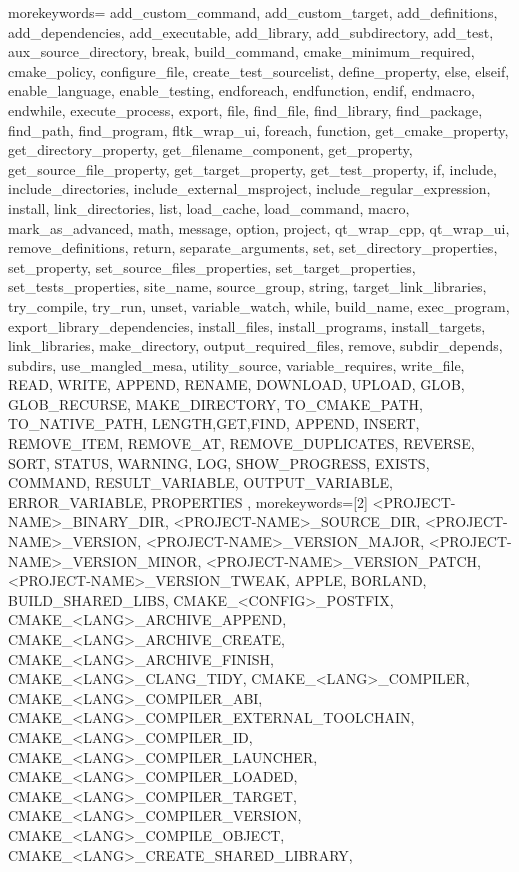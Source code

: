 	{
         morekeywords={
add_custom_command,
add_custom_target,
add_definitions,
add_dependencies,
add_executable,
add_library,
add_subdirectory,
add_test,
aux_source_directory,
break,
build_command,
cmake_minimum_required,
cmake_policy,
configure_file,
create_test_sourcelist,
define_property,
else,
elseif,
enable_language,
enable_testing,
endforeach,
endfunction,
endif,
endmacro,
endwhile,
execute_process,
export,
file,
find_file,
find_library,
find_package,
find_path,
find_program,
fltk_wrap_ui,
foreach,
function,
get_cmake_property,
get_directory_property,
get_filename_component,
get_property,
get_source_file_property,
get_target_property,
get_test_property,
if,
include,
include_directories,
include_external_msproject,
include_regular_expression,
install,
link_directories,
list,
load_cache,
load_command,
macro,
mark_as_advanced,
math,
message,
option,
project,
qt_wrap_cpp,
qt_wrap_ui,
remove_definitions,
return,
separate_arguments,
set,
set_directory_properties,
set_property,
set_source_files_properties,
set_target_properties,
set_tests_properties,
site_name,
source_group,
string,
target_link_libraries,
try_compile,
try_run,
unset,
variable_watch,
while,
build_name,
exec_program,
export_library_dependencies,
install_files,
install_programs,
install_targets,
link_libraries,
make_directory,
output_required_files,
remove,
subdir_depends,
subdirs,
use_mangled_mesa,
utility_source,
variable_requires,
write_file,
READ, WRITE, APPEND, RENAME, DOWNLOAD, UPLOAD,
GLOB, GLOB_RECURSE, MAKE_DIRECTORY,
TO_CMAKE_PATH, TO_NATIVE_PATH,
LENGTH,GET,FIND, APPEND, INSERT, REMOVE_ITEM, REMOVE_AT, REMOVE_DUPLICATES, REVERSE, SORT,
STATUS, WARNING, LOG, SHOW_PROGRESS, EXISTS, COMMAND,
RESULT_VARIABLE, OUTPUT_VARIABLE, ERROR_VARIABLE,
PROPERTIES
         },
         morekeywords=[2]{
<PROJECT-NAME>_BINARY_DIR,
<PROJECT-NAME>_SOURCE_DIR,
<PROJECT-NAME>_VERSION,
<PROJECT-NAME>_VERSION_MAJOR,
<PROJECT-NAME>_VERSION_MINOR,
<PROJECT-NAME>_VERSION_PATCH,
<PROJECT-NAME>_VERSION_TWEAK,
APPLE,
BORLAND,
BUILD_SHARED_LIBS,
CMAKE_<CONFIG>_POSTFIX,
CMAKE_<LANG>_ARCHIVE_APPEND,
CMAKE_<LANG>_ARCHIVE_CREATE,
CMAKE_<LANG>_ARCHIVE_FINISH,
CMAKE_<LANG>_CLANG_TIDY,
CMAKE_<LANG>_COMPILER,
CMAKE_<LANG>_COMPILER_ABI,
CMAKE_<LANG>_COMPILER_EXTERNAL_TOOLCHAIN,
CMAKE_<LANG>_COMPILER_ID,
CMAKE_<LANG>_COMPILER_LAUNCHER,
CMAKE_<LANG>_COMPILER_LOADED,
CMAKE_<LANG>_COMPILER_TARGET,
CMAKE_<LANG>_COMPILER_VERSION,
CMAKE_<LANG>_COMPILE_OBJECT,
CMAKE_<LANG>_CREATE_SHARED_LIBRARY,
}}
